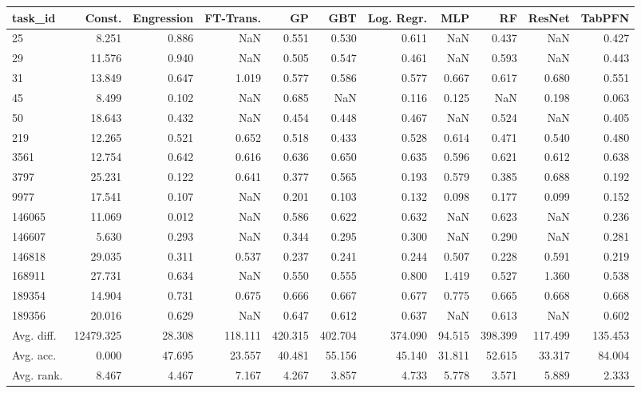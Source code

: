 \begin{tabular}{lrrrrrrrrrr}
\toprule
task\_id & Const. & Engression & FT-Trans. & GP & GBT & Log. Regr. & MLP & RF & ResNet & TabPFN \\
\midrule
25 & 8.251 & 0.886 & NaN & 0.551 & 0.530 & 0.611 & NaN & 0.437 & NaN & 0.427 \\
29 & 11.576 & 0.940 & NaN & 0.505 & 0.547 & 0.461 & NaN & 0.593 & NaN & 0.443 \\
31 & 13.849 & 0.647 & 1.019 & 0.577 & 0.586 & 0.577 & 0.667 & 0.617 & 0.680 & 0.551 \\
45 & 8.499 & 0.102 & NaN & 0.685 & NaN & 0.116 & 0.125 & NaN & 0.198 & 0.063 \\
50 & 18.643 & 0.432 & NaN & 0.454 & 0.448 & 0.467 & NaN & 0.524 & NaN & 0.405 \\
219 & 12.265 & 0.521 & 0.652 & 0.518 & 0.433 & 0.528 & 0.614 & 0.471 & 0.540 & 0.480 \\
3561 & 12.754 & 0.642 & 0.616 & 0.636 & 0.650 & 0.635 & 0.596 & 0.621 & 0.612 & 0.638 \\
3797 & 25.231 & 0.122 & 0.641 & 0.377 & 0.565 & 0.193 & 0.579 & 0.385 & 0.688 & 0.192 \\
9977 & 17.541 & 0.107 & NaN & 0.201 & 0.103 & 0.132 & 0.098 & 0.177 & 0.099 & 0.152 \\
146065 & 11.069 & 0.012 & NaN & 0.586 & 0.622 & 0.632 & NaN & 0.623 & NaN & 0.236 \\
146607 & 5.630 & 0.293 & NaN & 0.344 & 0.295 & 0.300 & NaN & 0.290 & NaN & 0.281 \\
146818 & 29.035 & 0.311 & 0.537 & 0.237 & 0.241 & 0.244 & 0.507 & 0.228 & 0.591 & 0.219 \\
168911 & 27.731 & 0.634 & NaN & 0.550 & 0.555 & 0.800 & 1.419 & 0.527 & 1.360 & 0.538 \\
189354 & 14.904 & 0.731 & 0.675 & 0.666 & 0.667 & 0.677 & 0.775 & 0.665 & 0.668 & 0.668 \\
189356 & 20.016 & 0.629 & NaN & 0.647 & 0.612 & 0.637 & NaN & 0.613 & NaN & 0.602 \\
Avg. diff. & 12479.325 & 28.308 & 118.111 & 420.315 & 402.704 & 374.090 & 94.515 & 398.399 & 117.499 & 135.453 \\
Avg. acc. & 0.000 & 47.695 & 23.557 & 40.481 & 55.156 & 45.140 & 31.811 & 52.615 & 33.317 & 84.004 \\
Avg. rank. & 8.467 & 4.467 & 7.167 & 4.267 & 3.857 & 4.733 & 5.778 & 3.571 & 5.889 & 2.333 \\
\bottomrule
\end{tabular}
